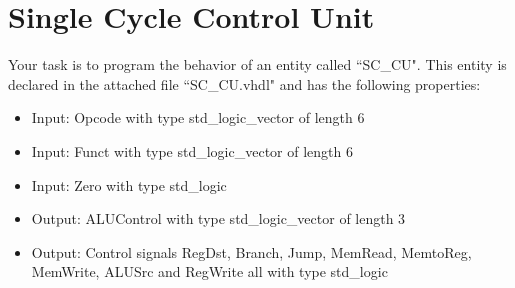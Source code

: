 \documentclass[a4paper,12pt]{article}
\begin{document}
\pagestyle{empty}
\setlength{\parindent}{0em} 
\section*{Single Cycle Control Unit}

Your task is to program the behavior of an entity called ``SC\_CU". This entity is declared in the attached file ``SC\_CU.vhdl" and has the following properties:
\begin{itemize}
\item Input:  Opcode with type std\_logic\_vector of length 6
\item Input:  Funct with type std\_logic\_vector of length 6
\item Input:  Zero with type std\_logic
\item Output: ALUControl with type std\_logic\_vector of length 3
\item Output: Control signals RegDst, Branch, Jump, MemRead, MemtoReg, MemWrite, ALUSrc and RegWrite all with type std\_logic
\end{itemize}
\end{document}
